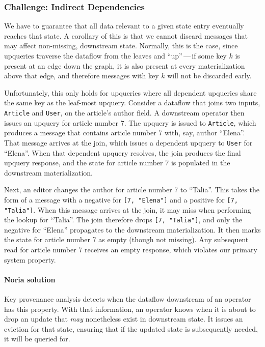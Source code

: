 \documentclass[fontsize=12pt,paper=letter]{scrartcl}
\begin{document}
\subsubsection{Challenge: Indirect Dependencies}

We have to guarantee that all data relevant to a given state entry
eventually reaches that state. A corollary of this is that we cannot
discard messages that may affect non-missing, downstream state.
Normally, this is the case, since upqueries traverse the dataflow from
the leaves and ``up''\,---\,if some key $k$ is present at an edge down the
graph, it is also present at every materialization above that edge, and
therefore messages with key $k$ will not be discarded early.

Unfortunately, this only holds for upqueries where all dependent
upqueries share the same key as the leaf-most upquery. Consider a
dataflow that joins two inputs, \texttt{Article} and \texttt{User}, on the article's
author field. A downstream operator then issues an upquery for article
number 7. The upquery is issued to \texttt{Article}, which produces a message
that contains article number 7 with, say, author ``Elena''. That message
arrives at the join, which issues a dependent upquery to \texttt{User} for
``Elena''. When that dependent upquery resolves, the join produces the
final upquery response, and the state for article number 7 is populated
in the downstream materialization.

Next, an editor changes the author for article number 7 to ``Talia''. This
takes the form of a message with a negative for \texttt{[7, "Elena"]} and a
positive for \texttt{[7, "Talia"]}. When this message arrives at the join, it
may miss when performing the lookup for ``Talia''. The join therefore
drops \texttt{[7, "Talia"]}, and only the negative for ``Elena'' propagates to
the downstream materialization. It then marks the state for article
number 7 as empty (though not missing). Any subsequent read for article
number 7 receives an empty response, which violates our primary system
property.

\paragraph{Noria solution}
Key provenance analysis detects when the dataflow downstream of an operator has
this property. With that information, an operator knows when it is about to drop
an update that \emph{may} nonetheless exist in downstream state. It issues an
eviction for that state, ensuring that if the updated state is subsequently
needed, it will be queried for.
\end{document}
